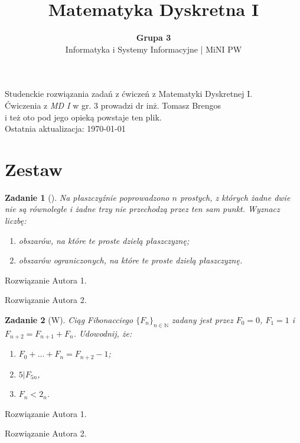 \documentclass{mwart}
\author{\textbf{Grupa 3} \\ \textsf{Informatyka i Systemy Informacyjne | MiNI PW}}
\title{%
\textbf{Matematyka Dyskretna I}}
\newtheorem{zad}{Zadanie}[section]
\begin{document}
\maketitle{}
\begin{center}
    Studenckie rozwiązania zadań z ćwiczeń z Matematyki Dyskretnej I. \\
    Ćwiczenia z \emph{MD I} w gr. 3 prowadzi dr inż. Tomasz Brengos \\
    i też oto pod jego opieką powstaje ten plik. \\
    Ostatnia aktualizacja: \today{} \\
    \tableofcontents
    \thispagestyle{specialfooter}

\end{center}
















\newpage
\section{Zestaw}              %
\begin{zad}[]
    Na płaszczyźnie poprowadzono $n$ prostych, z których żadne dwie nie
    są równoległe i żadne trzy nie przechodzą przez ten sam punkt.
    Wyznacz liczbę:
    \begin{enumerate}
        \item obszarów, na które te proste dzielą płaszczyznę;
        \item obszarów ograniczonych, na które te proste dzielą płaszczyznę.
    \end{enumerate}
\end{zad}
\begin{mdframed}
    Rozwiązanie Autora 1.
\end{mdframed}
\begin{mdframed}
    Rozwiązanie Autora 2.
\end{mdframed}



\begin{zad}[W]
    Ciąg Fibonacciego $\{F_n\}_{n \in \mathbb{N}}$ zadany jest przez
    $F_0=0$, $F_1=1$ i $F_{n+2}=F_{n+1}+F_n$. Udowodnij, że: \\
    \begin{enumerate}
        \item $F_0 + ... + F_n = F_{n+2} - 1$;
        \item $5|F_{5n}$,
        \item $F_n < 2_n$.
    \end{enumerate}
\end{zad}
\begin{mdframed}
    Rozwiązanie Autora 1.
\end{mdframed}
\begin{mdframed}
    Rozwiązanie Autora 2.
\end{mdframed}
\end{document}
